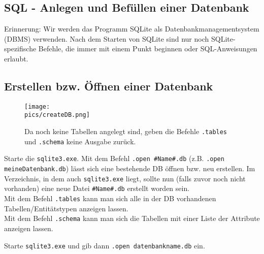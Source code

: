 \subsection[Anlegen/Befüllen einer DB]{SQL - Anlegen und Befüllen einer Datenbank}
Erinnerung: Wir werden das Programm SQLite als Datenbankmanagementsystem (DBMS) verwenden. Nach dem Starten von SQLite sind nur noch SQLite-spezifische Befehle, die immer mit einem Punkt beginnen oder SQL-Anweisungen erlaubt.

\subsection{Erstellen bzw. Öffnen einer Datenbank}
\begin{wrapfigure}{r}{6.91cm}
	\centering
	\texttt{[image: \\pics/createDB.png]}
	\caption*{Da noch keine Tabellen angelegt sind, geben die Befehle \lstinline!.tables! und \lstinline!.schema! keine Ausgabe zurück.}
\end{wrapfigure}
Starte die \texttt{sqlite3.exe}. Mit dem Befehl \lstinline!.open #Name#.db! (z.B. \lstinline!.open meineDatenbank.db!) lässt sich eine bestehende DB öffnen bzw. neu erstellen. Im Verzeichnis, in dem auch \texttt{sqlite3.exe} liegt, sollte nun (falls zuvor noch nicht vorhanden) eine neue Datei \texttt{\#Name\#.db} erstellt worden sein.\\
Mit dem Befehl \lstinline!.tables! kann man sich alle in der DB vorhandenen Tabellen/Entitätstypen anzeigen lassen.\\
Mit dem Befehl \lstinline!.schema! kann man sich die Tabellen mit einer Liste der Attribute anzeigen lassen.
\begin{tcolorbox}[title=Datenbank öffnen]
	Starte \texttt{sqlite3.exe} und gib dann \lstinline!.open datenbankname.db! ein.
\end{tcolorbox}

